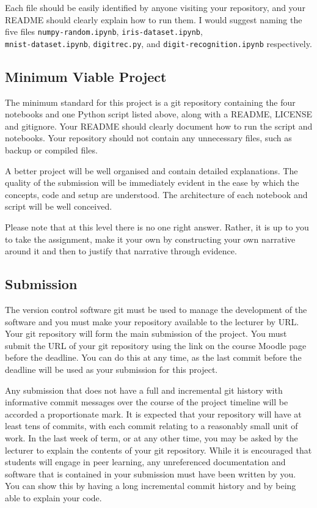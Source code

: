 \documentclass[12pt, a4paper]{article}
\begin{document}
Each file should be easily identified by anyone visiting your repository, and your README should clearly explain how to run them.
I would suggest naming the five files \texttt{numpy-random.ipynb}, \texttt{iris-dataset.ipynb}, \\ \texttt{mnist-dataset.ipynb}, \texttt{digitrec.py}, and \texttt{digit-recognition.ipynb} respectively.


\subsection*{Minimum Viable Project}
The minimum standard for this project is a git repository containing the four notebooks and one Python script listed above, along with a README, LICENSE and gitignore.
Your README should clearly document how to run the script and notebooks.
Your repository should not contain any unnecessary files, such as backup or compiled files.

A better project will be well organised and contain detailed explanations.
The quality of the submission will be immediately evident in the ease by which the concepts, code and setup are understood.
The architecture of each notebook and script will be well conceived.

Please note that at this level there is no one right answer.
Rather, it is up to you to take the assignment, make it your own by constructing your own narrative around it and then to justify that narrative through evidence.


\subsection*{Submission}
The version control software git must be used to manage the development of the software and you must make your repository available to the lecturer by URL.
Your git repository will form the main submission of the project.
You must submit the URL of your git repository using the link on the course Moodle page before the deadline.
You can do this at any time, as the last commit before the deadline will be used as your submission for this project.

Any submission that does not have a full and incremental git history with informative commit messages over the course of the project timeline will be accorded a proportionate mark.
It is expected that your repository will have at least tens of commits, with each commit relating to a reasonably small unit of work.
In the last week of term, or at any other time, you may be asked by the lecturer to explain the contents of your git repository.
While it is encouraged that students will engage in peer learning, any unreferenced documentation and software that is contained in your submission must have been written by you.
You can show this by having a long incremental commit history and by being able to explain your code.
\end{document}

